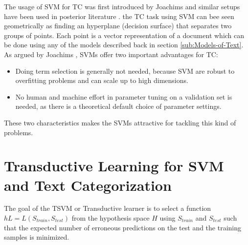 The usage of SVM for TC  was first introduced by Joachims \cite{Joachims98,Joachims99c}
and similar setups have been used in posterior literature \cite{DumaisPHS98}.
the TC task using SVM can bee seen geometrically as finding an hyperplane
(decision surface) that separates two groups of points. Each point
is a vector representation of a document which can be done using any
of the models described back in section \ref{sub:Models-of-Text}.
As argued by Joachims \cite{Joachims98}, SVMs offer two important
advantages for TC:

\begin{itemize}
\item Doing term selection is generally not needed, because SVM are robust
to overfitting problems and can scale up to high dimensions.
\item No human and machine effort in parameter tuning on a validation set
is needed, as there is a theoretical default choice of parameter settings.
\end{itemize}
These two characteristics makes the SVMs attractive for tackling this
kind of problems. 

\section{Transductive Learning for SVM and Text Categorization\label{sub:Transductive-Learning-for}}


The goal of the TSVM or Transductive learner is to select a function
$hL=L(S_{train},S_{test})$ from the hypothesis space $H$ using $S_{train}$
and $S_{test}$ such that the expected number of erroneous predictions
on the test and the training samples is minimized. 

